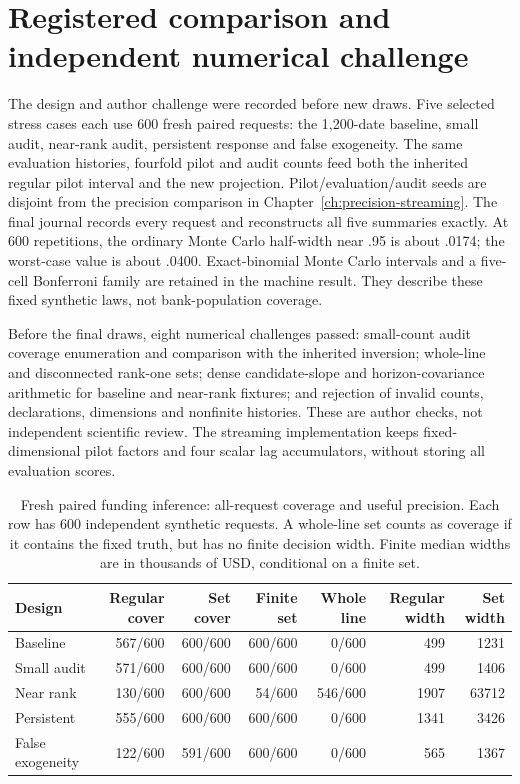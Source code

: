 \section{Registered comparison and independent numerical challenge}

The design and author challenge were recorded before new draws. Five selected
stress cases each use 600 fresh paired requests: the 1,200-date baseline,
small audit, near-rank audit, persistent response and false exogeneity. The
same evaluation histories, fourfold pilot and audit counts feed both the
inherited regular pilot interval and the new projection. Pilot/evaluation/audit
seeds are disjoint from the precision comparison in Chapter~\ref{ch:precision-streaming}. The final journal records every request and
reconstructs all five summaries exactly. At 600 repetitions, the ordinary
Monte Carlo half-width near .95 is about .0174; the worst-case value is about
.0400. Exact-binomial Monte Carlo intervals and a five-cell Bonferroni family
are retained in the machine result. They describe these fixed synthetic laws,
not bank-population coverage.

Before the final draws, eight numerical challenges passed: small-count audit
coverage enumeration and comparison with the inherited inversion; whole-line
and disconnected rank-one sets; dense candidate-slope and horizon-covariance
arithmetic for baseline and near-rank fixtures; and rejection of invalid
counts, declarations, dimensions and nonfinite histories. These are author
checks, not independent scientific review. The streaming implementation keeps
fixed-dimensional pilot factors and four scalar lag accumulators, without
storing all evaluation scores.

\begin{table}[htbp]
\centering\small
\caption{Fresh paired funding inference: all-request coverage and useful precision. Each row has 600 independent synthetic requests. A whole-line set counts as coverage if it contains the fixed truth, but has no finite decision width. Finite median widths are in thousands of USD, conditional on a finite set.}
\label{integrated:weak_audit_projection:tab:weak-audit-results}
\begin{tabular}{lrrrrrr}
\toprule
Design & Regular cover & Set cover & Finite set & Whole line & Regular width & Set width \\
\midrule
Baseline & 567/600 & 600/600 & 600/600 & 0/600 & 499 & 1231 \\
Small audit & 571/600 & 600/600 & 600/600 & 0/600 & 499 & 1406 \\
Near rank & 130/600 & 600/600 & 54/600 & 546/600 & 1907 & 63712 \\
Persistent & 555/600 & 600/600 & 600/600 & 0/600 & 1341 & 3426 \\
False exogeneity & 122/600 & 591/600 & 600/600 & 0/600 & 565 & 1367 \\
\bottomrule
\end{tabular}
\end{table}


